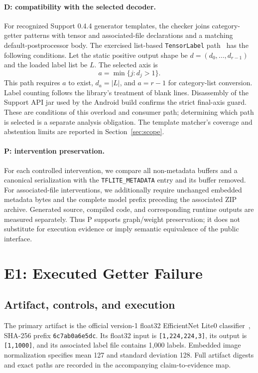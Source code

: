 \documentclass[10pt,twocolumn,letterpaper]{article}
\newcommand{\code}[1]{\texttt{#1}}
\begin{document}
\paragraph{D: compatibility with the selected decoder.}
For recognized Support 0.4.4 generator templates, the checker joins category-getter patterns with tensor and associated-file declarations and a matching default-postprocessor body. The exercised list-based \code{TensorLabel} path~\cite{tensorlabel} has the following conditions. Let the static positive output shape be $d=(d_0,\ldots,d_{r-1})$ and the loaded label list be $L$. The selected axis is
\begin{equation}
a=\min\{j:d_j>1\}.
\end{equation}
This path requires $a$ to exist, $d_a=|L|$, and $a=r-1$ for category-list conversion. Label counting follows the library's treatment of blank lines. Disassembly of the Support API jar used by the Android build confirms the strict final-axis guard. These are conditions of this overload and consumer path; determining which path is selected is a separate analysis obligation. The template matcher's coverage and abstention limits are reported in Section~\ref{sec:scope}.

\paragraph{P: intervention preservation.}
For each controlled intervention, we compare all non-metadata buffers and a canonical serialization with the \code{TFLITE\_METADATA} entry and its buffer removed. For associated-file interventions, we additionally require unchanged embedded metadata bytes and the complete model prefix preceding the associated ZIP archive. Generated source, compiled code, and corresponding runtime outputs are measured separately. Thus P supports graph/weight preservation; it does not substitute for execution evidence or imply semantic equivalence of the public interface.

\section{E1: Executed Getter Failure}
\label{sec:e1}
\subsection{Artifact, controls, and execution}
The primary artifact is the official version-1 float32 EfficientNet Lite0 classifier~\cite{efficientnet}, SHA-256 prefix \code{6c7ab0a6e5dc}. Its float32 input is \code{[1,224,224,3]}, its output is \code{[1,1000]}, and its associated label file contains 1,000 labels. Embedded image normalization specifies mean 127 and standard deviation 128. Full artifact digests and exact paths are recorded in the accompanying claim-to-evidence map.
\end{document}
